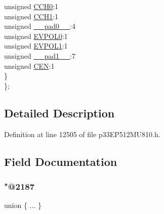 \begin{DoxyCompactItemize}
\begin{tabbing}
\>\>unsigned \hyperlink{structtag_c_m3_c_o_n_b_i_t_s_a9dad61251c4da1feccdccad790f76a62}{CCH0}:1\\
\>\>unsigned \hyperlink{structtag_c_m3_c_o_n_b_i_t_s_a7753603d75b7b22f224e8bd9325a0d15}{CCH1}:1\\
\>\>unsigned \hyperlink{structtag_c_m3_c_o_n_b_i_t_s_adf71f3d8410c1f1dbbc96680a92c49af}{\_\_pad0\_\_}:4\\
\>\>unsigned \hyperlink{structtag_c_m3_c_o_n_b_i_t_s_ab8a5977706a1608b0e9a1a91b9d3b3e3}{EVPOL0}:1\\
\>\>unsigned \hyperlink{structtag_c_m3_c_o_n_b_i_t_s_a0254aea1902c8c590f6753fefd1d8875}{EVPOL1}:1\\
\>\>unsigned \hyperlink{structtag_c_m3_c_o_n_b_i_t_s_acaf2d0924a107ec6e8d2e31febaf66f9}{\_\_pad1\_\_}:7\\
\>\>unsigned \hyperlink{structtag_c_m3_c_o_n_b_i_t_s_ac2fcf3da30303e5fdf269436a0fa4505}{CEN}:1\\
\>\} \\
\}; \\

\end{tabbing}\end{DoxyCompactItemize}


\subsection{Detailed Description}


Definition at line 12505 of file p33\+E\+P512\+M\+U810.\+h.



\subsection{Field Documentation}
\mbox{\label{structtag_c_m3_c_o_n_b_i_t_s_a6133052deec2951614913d55da9dce8d}} 
\subsubsection{\texorpdfstring{"@2187}{@2187}}
{\footnotesize\ttfamily union \{ ... \} }

\mbox{\label{structtag_c_m3_c_o_n_b_i_t_s_adf71f3d8410c1f1dbbc96680a92c49af}} 
